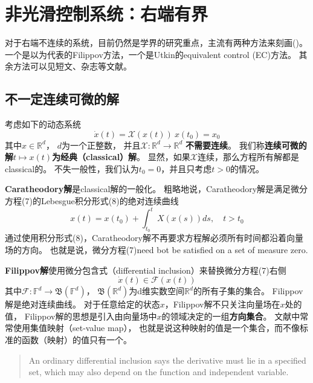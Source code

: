 \chapter{非光滑控制系统：右端有界}

对于右端不连续的系统，目前仍然是学界的研究重点，主流有两种方法来刻画(\cite{poznyakVadimUtkinSliding2023})。
一个是以\cite{filippovDifferentialEquationsDiscontinuous1988}为代表的Filippov方法，一个是Utkin的equivalent control (EC)方法。
其余方法可以见短文\cite{utkinBriefCommentsDoubts2022}、杂志\cite{cortesDiscontinuousDynamicalSystems2008}等文献。

\section{不一定连续可微的解}



考虑如下的动态系统 \[
\dot{x}(t)=\mathcal{X}(x(t))\ x(t_0)=x_0
\tag{7}
\] 其中\(x\in \mathbb{R}^d\)， \(d\)为一个正整数，
并且\(\mathcal{X}:\mathbb{R}^d \to \mathbb{R}^d\) \textbf{不需要连续}。
我们称\textbf{连续可微的解\(t \mapsto x(t)\)为经典（classical）解}。
显然，如果\(\mathcal{X}\)连续，那么方程所有解都是classical的。
不失一般性，我们认为\(t_0=0\)，并且只考虑\(t>0\)的情况。



\textbf{Caratheodory解}是classical解的一般化。
粗略地说，Caratheodory解是满足微分方程(7)的Lebesgue积分形式(8)的绝对连续曲线
\[
x(t)=x(t_0)+\int_{t_0}^t X(x(s)) ds,\quad t>t_0
\tag{8}
\]
通过使用积分形式(8)，Caratheodory解不再要求方程解必须所有时间都沿着向量场的方向。
也就是说，微分方程(7)need bot be satisfied on a set of measure zero.

\textbf{Filippov解}使用微分包含式（differential
inclusion）来替换微分方程(7)右侧 \[
\dot{x}(t)\in \mathcal{F} (x(t))
\] 其中\(\mathcal{F}:\mathbb{F}^d \to \mathfrak{B}(\mathbb{F}^d)\)，
\(\mathfrak{B}(\mathbb{R}^d)\)为d维实数空间\(\mathbb{R}^d\)的所有子集的集合。
Filippov解是绝对连续曲线。
对于任意给定的状态\(x\)，Filippov解不只关注向量场在\(x\)处的值，
Filippov解的思想是引入由向量场中\(x\)的领域决定的一组\textbf{方向集合}。
文献中常常使用集值映射（set-value map），
也就是说这种映射的值是一个集合，而不像标准的函数（映射）的值只有一个。

\begin{quote}
An ordinary differential inclusion says the derivative must lie in a
specified set, which may also depend on the function and independent
variable.
\end{quote}

